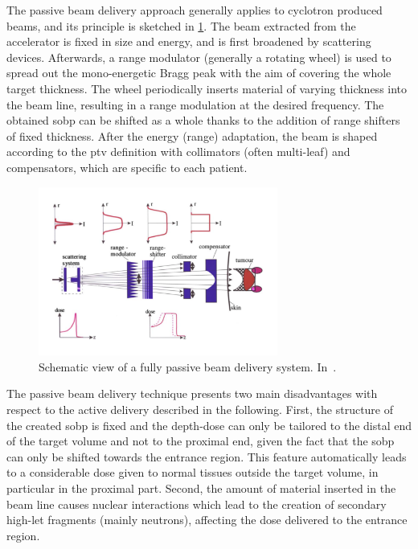 The passive beam delivery approach  generally applies to cyclotron produced beams, and its principle is sketched in \figurename\ref{chap1::fig::passiveDelivery}. The beam extracted from the accelerator is fixed in size and energy, and is first broadened by scattering devices. Afterwards, a range modulator (generally a rotating wheel) is used to spread out the mono-energetic Bragg peak with the aim of covering the whole target thickness. The wheel periodically inserts material of varying thickness into the beam line, resulting in a range modulation at the desired frequency. The obtained \gls{sobp} can be shifted as a whole thanks to the addition of range shifters of fixed thickness. After the energy (range) adaptation, the beam is shaped according to the \gls{ptv} definition with collimators (often multi-leaf) and compensators, which are specific to each patient.  

\begin{figure}[!htbp]
\centering
\includegraphics[width=0.7\textwidth]{03_GraphicFiles/chapter1_Introduction/passiveDelivery.pdf}
\caption{Schematic view of a fully passive beam delivery system. In~\cite{Schardt2010}.}
\label{chap1::fig::passiveDelivery}
\end{figure} 

The passive beam delivery technique presents two main disadvantages with respect to the active delivery described in the following. First, the structure of the created \gls{sobp} is fixed and the depth-dose can only be tailored to the distal end of the target volume and not to the proximal end, given the fact that the \gls{sobp} can only be shifted towards the entrance region. This feature automatically leads to a considerable dose given to normal tissues outside the target volume, in particular in the proximal part. Second, the amount of material inserted in the beam line causes nuclear interactions which lead to the creation of secondary high-\gls{let} fragments (mainly neutrons), affecting the dose delivered to the entrance region.

